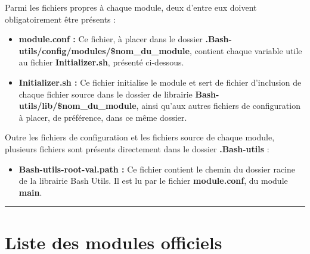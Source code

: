 \documentclass[a4paper,10pt]{article}
\begin{document}
\begin{justify}
    Parmi les fichiers propres à chaque module, deux d'entre eux doivent obligatoirement être présents :

    \begin{itemize}
        \item \textbf{\color{lime}module.conf\color{white} :} Ce fichier, à placer dans le dossier \textbf{\color{lime}.Bash-utils/config/modules/\$nom\_du\_module\color{white}}, contient chaque variable utile au fichier \textbf{\color{lime}Initializer.sh\color{white}}, présenté ci-dessous.\\

        \item \textbf{\color{lime}Initializer.sh\color{white} :} Ce fichier initialise le module et sert de fichier d'inclusion de chaque fichier source dans le dossier de librairie \textbf{\color{lime}Bash-utils/lib/\$nom\_du\_module\color{white}}, ainsi qu'aux autres fichiers de configuration à placer, de préférence, dans ce même dossier.
    \end{itemize}
\end{justify}

\begin{justify}
    Outre les fichiers de configuration et les fichiers source de chaque module, plusieurs fichiers sont présents directement dans le dossier \textbf{\color{lime}.Bash-utils\color{white}} :

    \begin{itemize}
        \item \textbf{\color{lime}Bash-utils-root-val.path\color{white} :} Ce fichier contient le chemin du dossier racine de la librairie Bash Utils. Il est lu par le fichier \textbf{\color{lime}module.conf\color{white}}, du module \color{lime}\textbf{main\color{white}}.
    \end{itemize}
\end{justify}





\color{red}\par\noindent\rule{\textwidth}{0.4pt}\color{white}

\color{red}
\section{Liste des modules officiels}\color{white}
\end{document}

